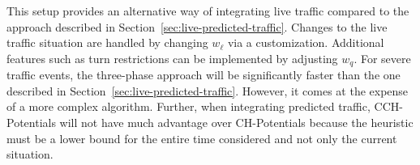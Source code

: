 \documentclass[manuscript,review]{acmart}
\begin{document}
This setup provides an alternative way of integrating live traffic compared to the approach described in Section~\ref{sec:live-predicted-traffic}.
Changes to the live traffic situation are handled by changing $w_\ell$ via a customization.
Additional features such as turn restrictions can be implemented by adjusting $w_q$.
For severe traffic events, the three-phase approach will be significantly faster than the one described in Section~\ref{sec:live-predicted-traffic}.
However, it comes at the expense of a more complex algorithm.
Further, when integrating predicted traffic, CCH-Potentials will not have much advantage over CH-Potentials because the heuristic must be a lower bound for the entire time considered and not only the current situation.




\end{document}
